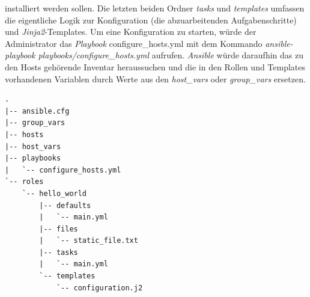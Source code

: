 \documentclass[titlepage]{report}
\begin{document}
installiert werden sollen. Die letzten beiden Ordner \emph{tasks} und
\emph{templates} umfassen die eigentliche Logik zur Konfiguration (die
abzuarbeitenden Aufgabenschritte) und \emph{Jinja2}\hyp{}Templates. Um
eine Konfiguration zu starten, würde der Administrator das
\emph{Playbook} {configure\_hosts.yml} mit dem Kommando
\emph{ansible-playbook playbooks/configure\_hosts.yml} aufrufen.
\emph{Ansible} würde daraufhin das zu den Hosts gehörende Inventar
heraussuchen und die in den Rollen und Templates vorhandenen Variablen
durch Werte aus den \emph{host\_vars} oder \emph{group\_vars} ersetzen.
\begin{minipage}{\linewidth}
\begin{lstlisting}[caption={Organisationsstruktur eines Ansible
Projekts},label={lst:ansiblestructure}]
.
|-- ansible.cfg
|-- group_vars
|-- hosts
|-- host_vars
|-- playbooks
|   `-- configure_hosts.yml
`-- roles
    `-- hello_world
        |-- defaults
        |   `-- main.yml
        |-- files
        |   `-- static_file.txt
        |-- tasks
        |   `-- main.yml
        `-- templates
            `-- configuration.j2
\end{lstlisting}
\end{minipage}
\end{document}
